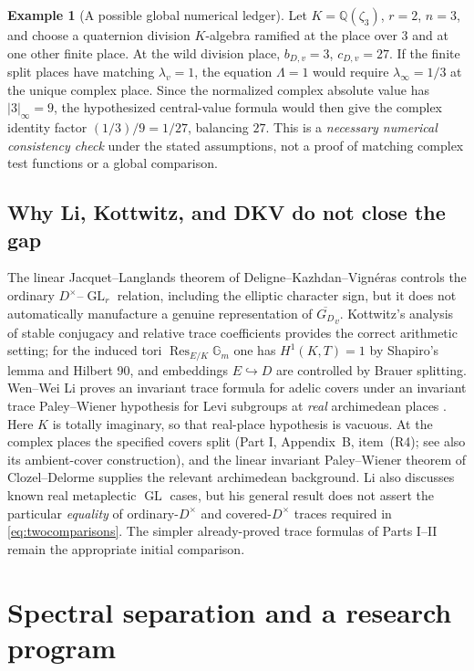 \documentclass[11pt]{article}
\newcommand{\GL}{\operatorname{GL}}
\newcommand{\GDb}{\overline{G_D}}
\theoremstyle{plain}
\theoremstyle{definition}
\newtheorem{example}[theorem]{Example}
\begin{document}
\begin{example}[A possible global numerical ledger]
\label{ex:ranktwoledger}
Let $K=\mathbb Q(\zeta_3)$, $r=2$, $n=3$, and choose a
quaternion division $K$-algebra ramified at the place over $3$
and at one other finite place.  At the wild division place,
$b_{D,v}=3$, $c_{D,v}=27$.  If the finite split places have
matching $\lambda_v=1$, the equation $\Lambda=1$ would require
$\lambda_\infty=1/3$ at the unique complex place.
Since the normalized complex absolute value has
$|3|_\infty=9$, the hypothesized central-value formula would then
give the complex identity factor $(1/3)/9=1/27$, balancing
$27$.  This is a \emph{necessary numerical consistency check}
under the stated assumptions, not a proof of matching complex
test functions or a global comparison.
\end{example}

\subsection{Why Li, Kottwitz, and DKV do not close the gap}\label{subsec:litroute}
The linear Jacquet--Langlands theorem of
Deligne--Kazhdan--Vign\'eras \cite{DKV} controls the ordinary
$D^\times$--$\GL_r$ relation, including the elliptic character
sign, but it does not automatically manufacture a genuine
representation of $\GDb_v$.  Kottwitz's analysis of stable
conjugacy and relative trace coefficients \cite{Kottwitz84}
provides the correct arithmetic setting; for the induced tori
$\operatorname{Res}_{E/K}\mathbb G_m$ one has
$H^1(K,T)=1$ by Shapiro's lemma and Hilbert 90, and embeddings
$E\hookrightarrow D$ are controlled by Brauer splitting.
Wen--Wei Li proves an invariant trace formula for adelic covers
under an invariant trace Paley--Wiener hypothesis for Levi subgroups
at \emph{real} archimedean places \cite{Li14}.  Here $K$ is totally
imaginary, so that real-place hypothesis is vacuous.  At the complex
places the specified covers split (Part I, Appendix~B, item~(R4);
see also its ambient-cover construction), and the linear invariant Paley--Wiener theorem
of Clozel--Delorme \cite{ClozelDelorme} supplies the relevant
archimedean background.  Li also discusses known real metaplectic
$\GL$ cases, but his general result does not assert the particular
\emph{equality} of ordinary-$D^\times$ and covered-$D^\times$
traces required in \eqref{eq:twocomparisons}.  The simpler already-proved trace formulas
of Parts I--II remain the appropriate initial comparison.

\section{Spectral separation and a research program}\label{sec:spectral}
\end{document}
